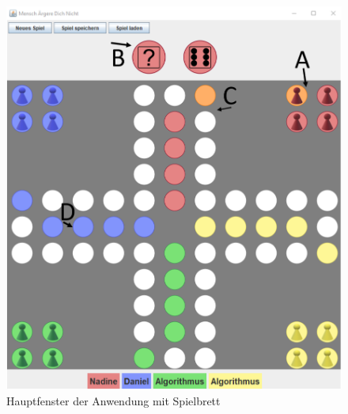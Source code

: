 \begin{figure}[htbp]
\centering
\centerline{\includegraphics[scale=.6]{anleitung5}}
\caption{Hauptfenster der Anwendung mit Spielbrett}
\label{fig:anleitung5}
\end{figure}

  


